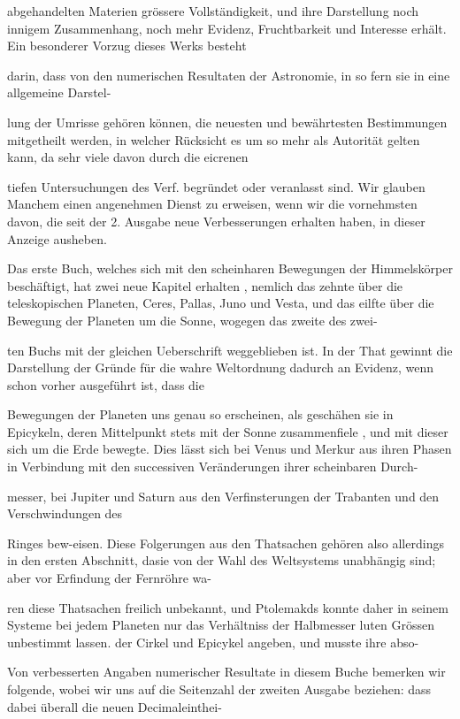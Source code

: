 \documentclass[10pt,a4paper]{article}
\begin{document}
abgehandelten Materien grössere Vollständigkeit, und ihre Darstellung noch innigem Zusammenhang, noch mehr Evidenz, Fruchtbarkeit und Interesse erhält. Ein besonderer Vorzug dieses Werks besteht

darin, dass von den numerischen Resultaten der Astronomie, in so fern sie in eine allgemeine Darstel-

lung der Umrisse gehören können, die neuesten und bewährtesten Bestimmungen mitgetheilt werden, in welcher Rücksicht es um so mehr als Autorität gelten kann, da sehr viele davon durch die eicrenen

tiefen Untersuchungen des Verf. begründet oder veranlasst sind. Wir glauben Manchem einen angenehmen Dienst zu erweisen, wenn wir die vornehmsten davon, die seit der 2. Ausgabe neue Verbesserungen erhalten haben, in dieser Anzeige ausheben.

Das erste Buch, welches sich mit den scheinharen Bewegungen der Himmelskörper beschäftigt, hat zwei neue Kapitel erhalten , nemlich das zehnte über die teleskopischen Planeten, Ceres, Pallas, Juno und Vesta, und das eilfte über die Bewegung der Planeten um die Sonne, wogegen das zweite des zwei-

ten Buchs mit der gleichen Ueberschrift weggeblieben ist. In der That gewinnt die Darstellung der Gründe für die wahre Weltordnung dadurch an Evidenz, wenn schon vorher ausgeführt ist, dass die

Bewegungen der Planeten uns genau so erscheinen, als geschähen sie in Epicykeln, deren Mittelpunkt stets mit der Sonne zusammenfiele , und mit dieser sich um die Erde bewegte. Dies lässt sich bei Venus und Merkur aus ihren Phasen in Verbindung mit den successiven Veränderungen ihrer scheinbaren Durch-

messer, bei Jupiter und Saturn aus den Verfinsterungen der Trabanten und den Verschwindungen des

Ringes bew-eisen. Diese Folgerungen aus den Thatsachen gehören also allerdings in den ersten Abschnitt, dasie von der Wahl des Weltsystems unabhängig sind; aber vor Erfindung der Fernröhre wa-

ren diese Thatsachen freilich unbekannt, und Ptolemakds konnte daher in seinem Systeme bei jedem Planeten nur das Verhältniss der Halbmesser luten Grössen unbestimmt lassen. der Cirkel und Epicykel angeben, und musste ihre abso-

Von verbesserten Angaben numerischer Resultate in diesem Buche bemerken wir folgende, wobei wir uns auf die Seitenzahl der zweiten Ausgabe beziehen: dass dabei überall die neuen Decimaleinthei-
\end{document}
